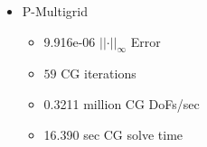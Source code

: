 \documentclass{beamer}
\begin{document}
\begin{frame}
\begin{center}
{\begin{multicols}{2}
\begin{itemize}
\begin{itemize}
\item 2.306 sec \hfill CG solve time \hspace{1em}

\end{itemize}

\item P-Multigrid

\begin{itemize}

\item 9.916e-06 \hfill $\lvert \lvert \cdot \rvert \rvert_\infty$ Error \hspace{1em}

\item $59$ \hfill CG iterations \hspace{1em}

\item 0.3211 million \hfill CG DoFs/sec \hspace{1em}

\item 16.390 sec \hfill CG solve time \hspace{1em}

\end{itemize}

\end{itemize}

\end{multicols}

}

\end{center}
\end{frame}

\end{document}
